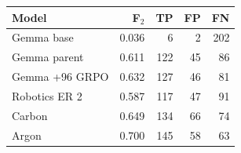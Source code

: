 \begin{tabular}{@{}lrrrr@{}}
\toprule
Model & F$_2$ & TP & FP & FN \\
\midrule
Gemma base & 0.036 & 6 & 2 & 202 \\
Gemma parent & 0.611 & 122 & 45 & 86 \\
Gemma +96 GRPO & 0.632 & 127 & 46 & 81 \\
Robotics ER 2 & 0.587 & 117 & 47 & 91 \\
Carbon & 0.649 & 134 & 66 & 74 \\
Argon & 0.700 & 145 & 58 & 63 \\
\bottomrule
\end{tabular}
